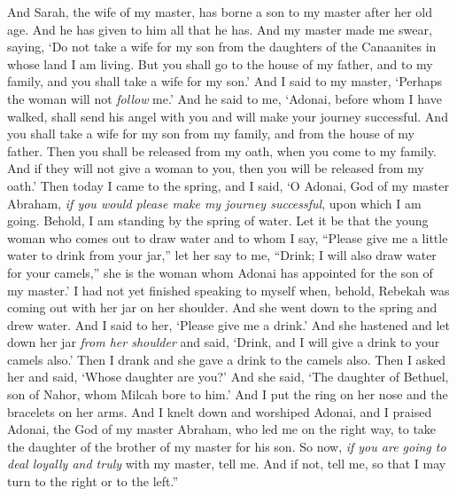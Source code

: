 \begin{biblechapter}
\verse And Sarah, the wife of my master, has borne a son to my master after her old age. And he has given to him all that he has.
\verse And my master made me swear, saying, ‘Do not take a wife for my son from the daughters of the Canaanites in whose land I am living.
\verse But you shall go to the house of my father, and to my family, and you shall take a wife for my son.’
\verse And I said to my master, ‘Perhaps the woman will not \textit{follow} me.’
\verse And he said to me, ‘Adonai, before whom I have walked, shall send his angel with you and will make your journey successful. And you shall take a wife for my son from my family, and from the house of my father.
\verse Then you shall be released from my oath, when you come to my family. And if they will not give a woman to you, then you will be released from my oath.’
\verse Then today I came to the spring, and I said, ‘O Adonai, God of my master Abraham, \textit{if you would please make my journey successful}, upon which I am going.
\verse Behold, I am standing by the spring of water. Let it be that the young woman who comes out to draw water and to whom I say, “Please give me a little water to drink from your jar,”
\verse let her say to me, “Drink; I will also draw water for your camels,” she is the woman whom Adonai has appointed for the son of my master.’
\verse I had not yet finished speaking to myself when, behold, Rebekah was coming out with her jar on her shoulder. And she went down to the spring and drew water. And I said to her, ‘Please give me a drink.’
\verse And she hastened and let down her jar \textit{from her shoulder} and said, ‘Drink, and I will give a drink to your camels also.’ Then I drank and she gave a drink to the camels also.
\verse Then I asked her and said, ‘Whose daughter are you?’ And she said, ‘The daughter of Bethuel, son of Nahor, whom Milcah bore to him.’ And I put the ring on her nose and the bracelets on her arms.
\verse And I knelt down and worshiped Adonai, and I praised Adonai, the God of my master Abraham, who led me on the right way, to take the daughter of the brother of my master for his son.
\verse So now, \textit{if you are going to deal loyally and truly} with my master, tell me. And if not, tell me, so that I may turn to the right or to the left.”

\end{biblechapter}
